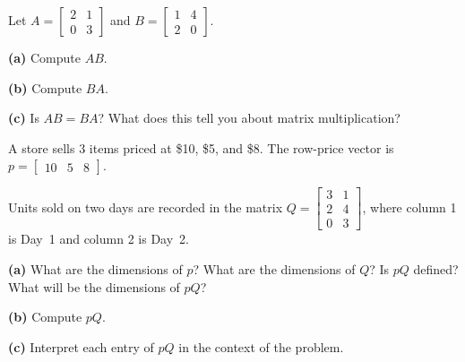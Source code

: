 \documentclass[10pt]{article}
\begin{document}
\begin{tcolorbox}[colback=white, colframe=black!40,
    title=\textbf{Tier A --- Apply: Does Order Matter?},
    fonttitle=\bfseries, arc=2mm, left=3mm, right=3mm, top=2mm, bottom=2mm]

Let $A = \begin{bmatrix}2 & 1 \\ 0 & 3\end{bmatrix}$ and $B = \begin{bmatrix}1 & 4 \\ 2 & 0\end{bmatrix}$.

\medskip
\textbf{(a)} Compute $AB$.
\vspace{1.8in}

\textbf{(b)} Compute $BA$.
\vspace{1.8in}

\textbf{(c)} Is $AB = BA$? \underline{\hspace{2cm}} \quad
What does this tell you about matrix multiplication?
\vspace{0.6in}

\end{tcolorbox}

\vspace{0.1in}

\begin{tcolorbox}[colback=white, colframe=black!40,
    title=\textbf{Tier E --- Extend: Revenue Matrix},
    fonttitle=\bfseries, arc=2mm, left=3mm, right=3mm, top=2mm, bottom=2mm]

A store sells 3 items priced at \$10, \$5, and \$8. The row-price vector is
$p = \begin{bmatrix}10 & 5 & 8\end{bmatrix}$.

Units sold on two days are recorded in the matrix
$Q = \begin{bmatrix}3 & 1 \\ 2 & 4 \\ 0 & 3\end{bmatrix}$,
where column 1 is Day~1 and column 2 is Day~2.

\medskip
\textbf{(a)} What are the dimensions of $p$? \underline{\hspace{2cm}}
What are the dimensions of $Q$? \underline{\hspace{2cm}}
Is $pQ$ defined? \underline{\hspace{1.5cm}}
What will be the dimensions of $pQ$? \underline{\hspace{2cm}}

\medskip
\textbf{(b)} Compute $pQ$.
\vspace{1.6in}

\textbf{(c)} Interpret each entry of $pQ$ in the context of the problem.
\vspace{0.8in}

\end{tcolorbox}
\end{document}
